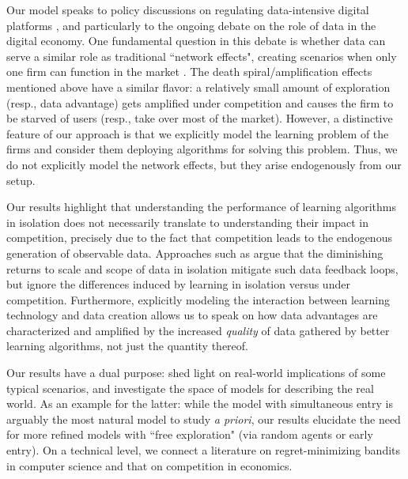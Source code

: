 Our model speaks to policy discussions on regulating data-intensive digital platforms \citep{furman2019unlocking, scott2019committee}, and particularly to the ongoing debate on the role of data in the digital economy. One fundamental question in this debate is whether data can serve a similar role as traditional ``network effects", creating scenarios when only one firm can function in the market \citep{Rysman09, jullien2019economics}.
The death spiral/amplification effects mentioned above have a similar flavor: a relatively small amount of exploration (resp., data advantage)  gets amplified under competition and causes the firm to be starved of users (resp., take over most of the market).
However, a distinctive feature of our approach is that we explicitly model the learning problem of the firms and consider them deploying algorithms for solving this problem.  Thus, we do not explicitly model the network effects, but they arise endogenously from our setup.

Our results highlight that understanding the performance of learning algorithms in isolation does not necessarily translate to understanding their impact in competition, precisely due to the fact that competition leads to the endogenous generation of observable data. Approaches such as \citet{lambrecht2015can, bajari2018impact, varian2018artificial} argue that the diminishing returns to scale and scope of data in isolation mitigate such data feedback loops,
but ignore the differences induced by learning in isolation versus under competition. Furthermore, explicitly modeling the interaction between learning technology and data creation allows us to speak on how data advantages are characterized and amplified by the increased \emph{quality} of data gathered by better learning algorithms, not just the quantity thereof.

Our results have a dual purpose: shed light on real-world implications of some typical scenarios, and investigate the space of models for describing the real world. As an example for the latter: while the \HardMax model with simultaneous entry is arguably the most natural model to study \emph{a priori}, our results elucidate the need for more refined models with ``free exploration" (\eg via random agents or early entry). On a technical level, we connect a literature on regret-minimizing bandits in computer science and that on competition in economics.

